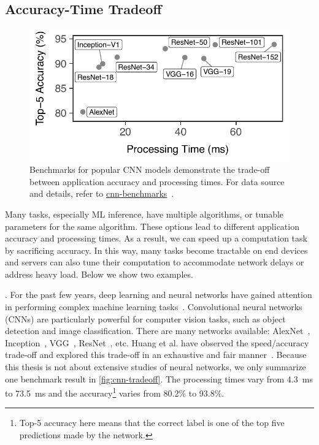 \subsection{Accuracy-Time Tradeoff}
\label{sec:comp-perf-model}

\begin{figure}[t]
  \centering
  \includegraphics[width=.7\columnwidth]{figures/tradeoff-cnn.pdf}
  \caption{Benchmarks for popular CNN models demonstrate the trade-off between
    application accuracy and processing times. For data source and details,
    refer to
    \href{https://github.com/jcjohnson/cnn-benchmarks}{cnn-benchmarks}~\cite{cnn.benchmarks}.
  }
  \label{fig:cnn-tradeoff}
\end{figure}

Many tasks, especially ML inference, have multiple algorithms, or tunable
parameters for the same algorithm. These options lead to different application
accuracy and processing times. As a result, we can speed up a computation task
by sacrificing accuracy. In this way, many tasks become tractable on end devices
and servers can also tune their computation to accommodate network delays or
address heavy load. Below we show two examples.

. For the past few years, deep
learning and neural networks have gained attention in performing complex machine
learning tasks~\cite{goodfellow2016deep}. Convolutional neural networks (CNNs)
are particularly powerful for computer vision tasks, such as object detection
and image classification. There are many networks available:
AlexNet~\cite{krizhevsky2012imagenet}, Inception~\cite{szegedy2015going},
VGG~\cite{simonyan2014very}, ResNet~\cite{he2016deep}, etc. Huang et al. have
observed the speed/accuracy trade-off and explored this trade-off in an
exhaustive and fair manner~\cite{huang2016speed}. Because this thesis is not
about extensive studies of neural networks, we only summarize one benchmark
result in \autoref{fig:cnn-tradeoff}. The processing times vary from
\SI{4.3}{\ms} to \SI{73.5}{\ms} and the accuracy\footnote{Top-5 accuracy here
  means that the correct label is one of the top five predictions made by the
  network.} varies from 80.2\% to 93.8\%.

